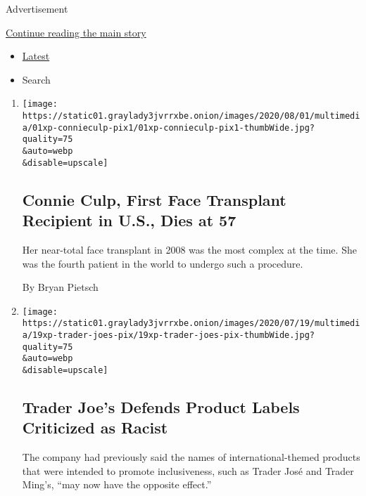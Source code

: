 Advertisement

\protect\hyperlink{after-mid1}{Continue reading the main story}

\begin{itemize}
\tightlist
\item
  \protect\hyperlink{stream-panel}{Latest}
\item
  Search
\end{itemize}

\begin{enumerate}
\def\labelenumi{\arabic{enumi}.}
\item
  \href{/2020/08/01/us/Connie-culp-dead-face-transplant.html}{}

  \texttt{[image: https://static01.graylady3jvrrxbe.onion/images/2020/08/01/multimedia/01xp-connieculp-pix1/01xp-connieculp-pix1-thumbWide.jpg?quality=75\\\&auto=webp\\\&disable=upscale]}

  \hypertarget{connie-culp-first-face-transplant-recipient-in-us-dies-at-57}{%
  \subsection{Connie Culp, First Face Transplant Recipient in U.S., Dies
  at
  57}\label{connie-culp-first-face-transplant-recipient-in-us-dies-at-57}}

  Her near-total face transplant in 2008 was the most complex at the
  time. She was the fourth patient in the world to undergo such a
  procedure.

  By Bryan Pietsch
\item
  \href{/2020/08/01/us/trader-joes-jose-ming-joe-san.html}{}

  \texttt{[image: https://static01.graylady3jvrrxbe.onion/images/2020/07/19/multimedia/19xp-trader-joes-pix/19xp-trader-joes-pix-thumbWide.jpg?quality=75\\\&auto=webp\\\&disable=upscale]}

  \hypertarget{trader-joes-defends-product-labels-criticized-as-racist}{%
  \subsection{Trader Joe's Defends Product Labels Criticized as
  Racist}\label{trader-joes-defends-product-labels-criticized-as-racist}}

  The company had previously said the names of international-themed
  products that were intended to promote inclusiveness, such as Trader
  José and Trader Ming's, ``may now have the opposite effect.''


\end{enumerate}
